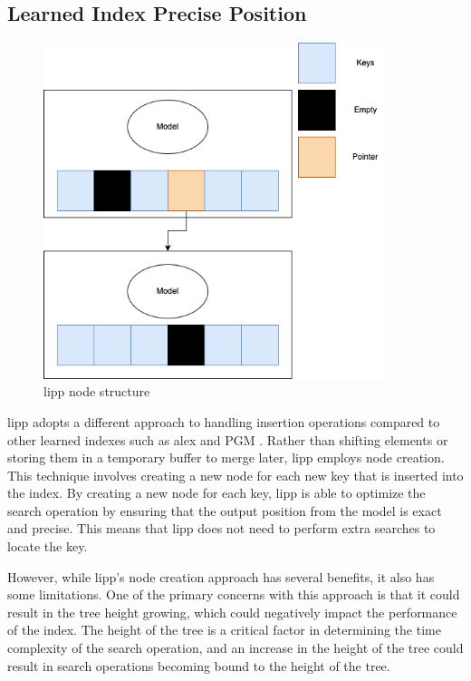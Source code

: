 \documentclass[11pt,a4paper]{article}
\begin{document}
\subsection{Learned Index Precise Position} \label{LIPP}
\begin{figure}
    \centering
    \includegraphics[width=100mm,scale=1]{Figures/LippNode.png}
    \caption{
     \acrshort{lipp} node structure
    }
    \label{fig:lipp-node}
\end{figure}
\acrfull{lipp} adopts a different approach to handling insertion operations compared to other learned indexes such as \acrshort{alex} and PGM \cite{PGM}. Rather than shifting elements or storing them in a temporary buffer to merge later, \acrshort{lipp} employs node creation. This technique involves creating a new node for each new key that is inserted into the index. By creating a new node for each key, \acrshort{lipp} is able to optimize the search operation by ensuring that the output position from the model is exact and precise. This means that \acrshort{lipp} does not need to perform extra searches to locate the key.

However, while \acrshort{lipp}'s node creation approach has several benefits, it also has some limitations. One of the primary concerns with this approach is that it could result in the tree height growing, which could negatively impact the performance of the index. The height of the tree is a critical factor in determining the time complexity of the search operation, and an increase in the height of the tree could result in search operations becoming bound to the height of the tree.
\end{document}

